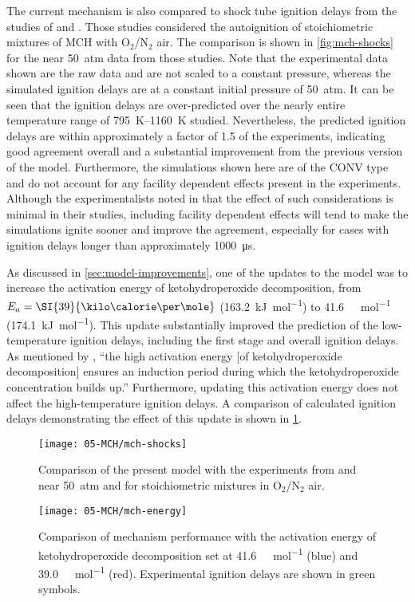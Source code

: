 \documentclass[../main.tex]{subfiles}
\begin{document}
The current mechanism is also compared to shock tube ignition delays from the
studies of \textcite{Vasu2009} and \textcite{Vanderover2009}. Those studies
considered the autoignition of stoichiometric mixtures of MCH with O$_2$/N$_2$
air. The comparison is shown in \cref{fig:mch-shocks} for the near \SI{50}{atm}
data from those studies. Note that the experimental data shown are the raw
data and are not scaled to a constant pressure, whereas the simulated
ignition delays are at a constant initial pressure of \SI{50}{atm}. It can be seen
that the ignition delays are over-predicted over the nearly entire temperature
range of \SIrange{795}{1160}{\kelvin} studied. Nevertheless, the predicted ignition delays are
within approximately a factor of 1.5 of the experiments, indicating good
agreement overall and a substantial improvement from the previous version of
the model. Furthermore, the simulations shown here are of the CONV type and
do not account for any facility dependent effects present in the experiments.
Although the experimentalists noted in \cite{Vasu2009,Vanderover2009} that the
effect of such considerations is minimal in their studies, including facility
dependent effects will tend to make the simulations ignite sooner and improve
the agreement, especially for cases with ignition delays longer than
approximately \SI{1000}{\micro\second}.

As discussed in \cref{sec:model-improvements}, one of the updates to the model
was to increase the activation energy of ketohydroperoxide decomposition, from
$E_a=\SI{39}{\kilo\calorie\per\mole}$ (\SI{163.2}{\kilo\joule\per\mole}) to
\SI{41.6}{\kilo\calorie\per\mole} (\SI{174.1}{\kilo\joule\per\mole}). This
update substantially improved the prediction of the low-temperature ignition
delays, including the first stage and overall ignition delays. As mentioned by
\textcite{Curran2002}, ``the high activation energy [of ketohydroperoxide
decomposition] ensures an induction period during which the ketohydroperoxide
concentration builds up.'' Furthermore, updating this activation energy does not
affect the high-temperature ignition delays. A comparison of calculated
ignition delays demonstrating the effect of this update is shown in
\cref{fig:mch-energy}.

\begin{figure}
    \begin{floatrow}
        \ffigbox
            {\texttt{[image: 05-MCH/mch-shocks]}}
            {\caption{Comparison of the present model with the experiments from
                \textcite{Vasu2009} and \textcite{Vanderover2009} near \SI{50}{atm}
                and for stoichiometric mixtures in O$_2$/N$_2$ air.}
            \label{fig:mch-shocks}}
        \ffigbox
            {\texttt{[image: 05-MCH/mch-energy]}}
            {\caption{Comparison of mechanism performance with the activation energy
                of ketohydroperoxide decomposition set at \SI{41.6}{\kilo\calorie\per\mole} (blue) and
                \SI{39.0}{\kilo\calorie\per\mole} (red). Experimental ignition delays are shown in
                green symbols.}
            \label{fig:mch-energy}}
    \end{floatrow}
\end{figure}
\end{document}
